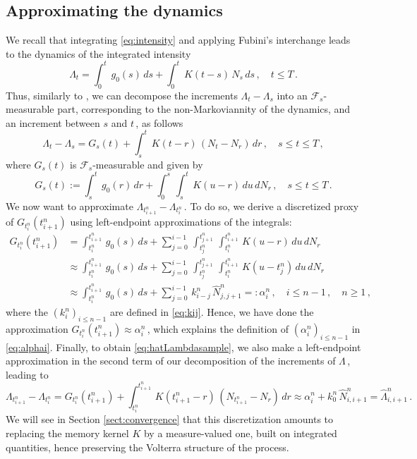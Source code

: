 \documentclass{article}
\newcommand{\1}{\mathbbm{1}}
\numberwithin{equation}{section}
\begin{document}
\subsection{Approximating the dynamics}
\label{subsec:dynamic_approx}
We recall that integrating \eqref{eq:intensity} and applying Fubini's interchange leads to the dynamics of the integrated intensity
$$
\Lambda_t = \int_0^t\,g_0(s)\,ds + \int_0^t\,K(t-s)\,N_s\,ds\,,\quad t \leq T\,.
$$
Thus, similarly to \citet[Proposition~1.1]{jaber2025simulating}, we can decompose the increments $\Lambda_t - \Lambda_s$ into an $\mathcal F_s$-measurable part, corresponding to the non-Markoviannity of the dynamics, and an increment between $s$ and $t\,$, as follows
$$
\Lambda_t - \Lambda_s = G_s(t) + \int_s^t\,K(t-r)\,(N_t - N_r)\,dr\,, \quad s \leq t \leq T\,, 
$$
where $G_s(t)$ is $\mathcal F_s$-measurable and given by 
\begin{equation}
\label{eq:G_s_t}
G_s(t) := \int_s^t\,g_0(r)\,dr + \int_0^s\,\int_s^t\,K(u-r)\,du\,dN_r\,,\quad s \leq t \leq T\,.
\end{equation}
We now want to approximate $\Lambda_{t^n_{i+1}} - \Lambda_{t^n_i}\,$. To do so, we derive a discretized proxy of $G_{t^n_i}(t^n_{i+1})$ using left-endpoint approximations of the integrals:
\begin{align*}
    G_{t^n_i}(t^n_{i+1}) &= \int_{t^n_i}^{t^n_{i+1}}\,g_0(s)\,ds + \sum_{j= 0}^{i-1}\,\int_{t^n_j}^{t^n_{j+1}}\,\int_{t^n_i}^{t^n_{i+1}}\,K(u-r)\,du\,dN_r \\
    &\approx \int_{t^n_i}^{t^n_{i+1}}\,g_0(s)\,ds + \sum_{j= 0}^{i-1}\,\int_{t^n_j}^{t^n_{j+1}}\,\int_{t^n_i}^{t^n_{i+1}}\,K(u-t^n_{j})\,du\,dN_r \\
    &\approx \int_{t^n_i}^{t^n_{i+1}}\,g_0(s)\,ds + \sum_{j= 0}^{i-1}\,k^n_{i-j}\,\widehat N_{{j, j+1}}^n  =: \alpha_i^n\,, \quad i \leq n-1\,, \quad n \geq 1\,,
\end{align*}
where the $\left(k^n_i\right)_{i \leq n-1}$ are defined in \eqref{eq:kij}. Hence, we have done the approximation $G_{t^n_i}(t^n_{i+1}) \approx \alpha^n_i\,$, which explains the definition of $\left(\alpha^n_i\right)_{i \leq n-1}$ in \eqref{eq:alphai}.
Finally, to obtain \eqref{eq:hatLambdasample}, we also make a left-endpoint approximation in the second term of our decomposition of the increments of $\Lambda\,$, leading to
\begin{equation}\label{eq:Lam_N_relationship}
    \Lambda_{t^n_{i+1}} - \Lambda_{t^n_i} = G_{t^n_i}(t^n_{i+1}) + \int_{t^n_i}^{t^n_{i+1}}\,K(t^n_{i+1} - r)\,\left(N_{t^n_{i+1}} - N_r\right)\,dr \approx \alpha^n_i + k_0^n \,\widehat N^n_{i,i+1} = \widehat \Lambda^n_{i,i+1}\,.
\end{equation}
We will see in Section \ref{sect:convergence} that this discretization amounts to replacing the memory kernel $K$ by a measure-valued one, built on integrated quantities, hence preserving the Volterra structure of the process.
\end{document}
